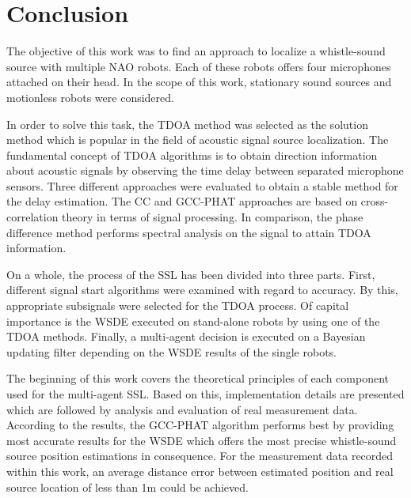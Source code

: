 \chapter{Conclusion}
\label{chap:05_conclusion}

The objective of this work was to find an approach to localize a whistle-sound
source with multiple NAO robots. 
Each of these robots offers four microphones attached on their head.
In the scope of this work, stationary sound sources and motionless robots were
considered.

In order to solve this task, the \acf{TDOA} method was selected as the solution method
which is popular in the field of acoustic signal source localization. 
The fundamental concept of \ac{TDOA} algorithms is to obtain direction information
about acoustic signals by observing the time delay between separated microphone sensors.
Three different approaches were evaluated to obtain a stable method
for the delay estimation.
The \acf{CC} and \acf{GCC-PHAT} approaches are based on cross-correlation theory in terms
of signal processing.
In comparison, the phase difference method performs spectral analysis on the signal
to attain \ac{TDOA} information.

On a whole, the process of the \acf{SSL} has been divided into three parts.
First, different signal start algorithms were examined with regard to accuracy.
By this, appropriate subsignals were selected for the \ac{TDOA} process.
Of capital importance is the \acf{WSDE} executed on stand-alone robots by
using one of the \ac{TDOA} methods.
Finally, a multi-agent decision is executed on a Bayesian updating filter
depending on the \ac{WSDE} results of the single robots.

The beginning of this work covers the theoretical principles of each component
used for the multi-agent \ac{SSL}.
Based on this, implementation details are presented which are followed by analysis
and evaluation of real measurement data.
According to the results, the \acf{GCC-PHAT} algorithm performs best by
providing most accurate results for the \ac{WSDE} which offers the most precise
whistle-sound source position estimations in consequence.
For the measurement data recorded within this work, an average
distance error between estimated position and real source location
of less than 1\si{\meter} could be achieved.


